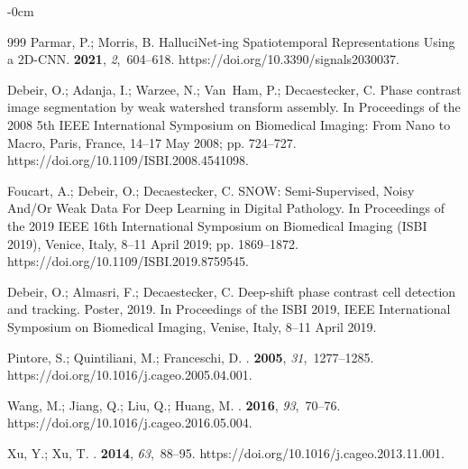 \documentclass[sensors,article,accept,moreauthors,pdftex]{Definitions/mdpi}
\begin{document}
\begin{adjustwidth}{-\extralength}{0cm}
\begin{thebibliography}{999}
Parmar, P.; Morris, B.
\newblock HalluciNet-ing Spatiotemporal Representations Using a 2D-CNN.
 {\bf 2021}, {\em 2},~604--618.
\newblock
 {https://doi.org/10.3390/signals2030037}.

Debeir, O.; Adanja, I.; Warzee, N.; Van~Ham, P.; Decaestecker, C.
\newblock Phase contrast image segmentation by weak watershed transform
  assembly.
\newblock  In Proceedings of the 2008 5th IEEE International Symposium on Biomedical Imaging: From
  Nano to Macro, Paris, France, 14--17 May 2008; pp. 724--727. %
\newblock
 {https://doi.org/10.1109/ISBI.2008.4541098}.

Foucart, A.; Debeir, O.; Decaestecker, C.
\newblock SNOW: Semi-Supervised, Noisy And/Or Weak Data For Deep Learning in
  Digital Pathology.
\newblock  In Proceedings of the 2019 IEEE 16th International Symposium on Biomedical Imaging (ISBI
  2019), Venice, Italy, 8--11 April 2019; pp. 1869--1872. %
\newblock
{https://doi.org/10.1109/ISBI.2019.8759545}.

Debeir, O.; Almasri, F.; Decaestecker, C.
\newblock Deep-shift phase contrast cell detection and tracking.
\newblock Poster,  2019.
\newblock In Proceedings of the ISBI 2019, IEEE International
  Symposium on Biomedical Imaging, Venise, Italy, 8--11 April 2019.

Pintore, S.; Quintiliani, M.; Franceschi, D.
.
 {\bf 2005}, {\em 31},~1277--1285.
\newblock
 {https://doi.org/10.1016/j.cageo.2005.04.001}.

Wang, M.; Jiang, Q.; Liu, Q.; Huang, M.
.
 {\bf 2016}, {\em 93},~70–76.
\newblock
  {https://doi.org/10.1016/j.cageo.2016.05.004}.

Xu, Y.; Xu, T.
.
 {\bf 2014}, {\em 63},~88--95.
\linebreak
{https://doi.org/10.1016/j.cageo.2013.11.001}.


\end{thebibliography}
\end{adjustwidth}
\end{document}
